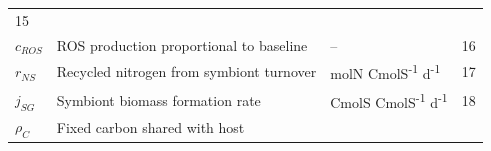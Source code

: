 \documentclass[]{elsarticle} %
\begin{document}
\begin{longtable}[c]{@{}llll@{}}
\begin{minipage}[t]{0.10\columnwidth}
15
\strut\end{minipage}\tabularnewline
\begin{minipage}[t]{0.12\columnwidth}\raggedright\strut
\(c_{ROS}\)
\strut\end{minipage} &
\begin{minipage}[t]{0.48\columnwidth}\raggedright\strut
ROS production proportional to baseline
\strut\end{minipage} &
\begin{minipage}[t]{0.26\columnwidth}\raggedright\strut
--
\strut\end{minipage} &
\begin{minipage}[t]{0.10\columnwidth}\raggedright\strut
16
\strut\end{minipage}\tabularnewline
\begin{minipage}[t]{0.12\columnwidth}\raggedright\strut
\(r_{NS}\)
\strut\end{minipage} &
\begin{minipage}[t]{0.48\columnwidth}\raggedright\strut
Recycled nitrogen from symbiont turnover
\strut\end{minipage} &
\begin{minipage}[t]{0.26\columnwidth}\raggedright\strut
molN CmolS\textsuperscript{-1} d\textsuperscript{-1}
\strut\end{minipage} &
\begin{minipage}[t]{0.10\columnwidth}\raggedright\strut
17
\strut\end{minipage}\tabularnewline
\begin{minipage}[t]{0.12\columnwidth}\raggedright\strut
\(j_{SG}\)
\strut\end{minipage} &
\begin{minipage}[t]{0.48\columnwidth}\raggedright\strut
Symbiont biomass formation rate
\strut\end{minipage} &
\begin{minipage}[t]{0.26\columnwidth}\raggedright\strut
CmolS CmolS\textsuperscript{-1} d\textsuperscript{-1}
\strut\end{minipage} &
\begin{minipage}[t]{0.10\columnwidth}\raggedright\strut
18
\strut\end{minipage}\tabularnewline
\begin{minipage}[t]{0.12\columnwidth}\raggedright\strut
\(\rho_C\)
\strut\end{minipage} &
\begin{minipage}[t]{0.48\columnwidth}\raggedright\strut
Fixed carbon shared with host
\strut\end{minipage} &

\end{longtable}
\end{document}
